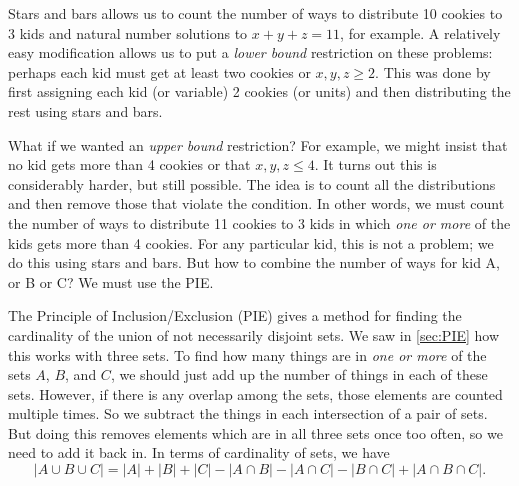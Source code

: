 \documentclass[12pt]{article}
\begin{document}
Stars and bars allows us to count the number of ways to distribute 10 cookies to 3 kids and natural number solutions to $x+y+z = 11$, for example.  A relatively easy modification allows us to put a \emph{lower bound} restriction on these problems: perhaps each kid must get at least two cookies or $x,y,z \ge 2$.  This was done by first assigning each kid (or variable) 2 cookies (or units) and then distributing the rest using stars and bars.

What if we wanted an \emph{upper bound} restriction?  For example, we might insist that no kid gets more than 4 cookies or that $x, y, z \le 4$.  It turns out this is considerably harder, but still possible.  The idea is to count all the distributions and then remove those that violate the condition.  In other words, we must count the number of ways to distribute 11 cookies to 3 kids in which \emph{one or more} of the kids gets more than 4 cookies.  For any particular kid, this is not a problem; we do this using stars and bars.  But how to combine the number of ways for kid A, or B or C?  We must use the PIE.  


The Principle of Inclusion/Exclusion (PIE) gives a method for finding the cardinality of the union of not necessarily disjoint sets.  We saw in \autoref{sec:PIE} how this works with three sets.  To find how many things are in \emph{one or more} of the sets $A$, $B$, and $C$, we should just add up the number of things in each of these sets.  However, if there is any overlap among the sets, those elements are counted multiple times.  So we subtract the things in each intersection of a pair of sets.  But doing this removes elements which are in all three sets once too often, so we need to add it back in.  In terms of cardinality of sets, we have
\[|A \cup B \cup C| = |A| + |B| + |C| - |A \cap B| - |A \cap C| - |B \cap C| + |A\cap B \cap C|.\]
\end{document}
